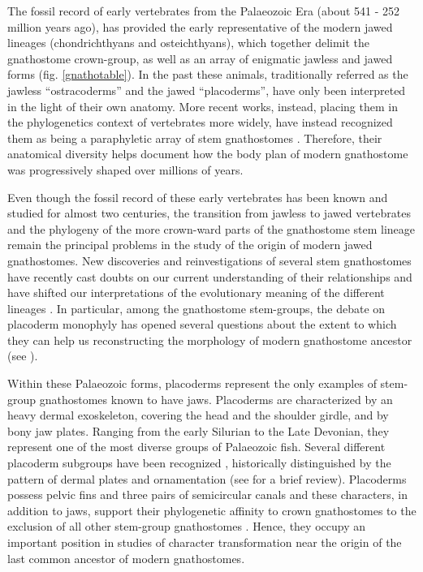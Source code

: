 \documentclass[11pt,letterpaper]{report}
\begin{document}
The fossil record of early vertebrates from the Palaeozoic Era (about 541 - 252 million years ago), has provided the early representative of the modern jawed lineages (chondrichthyans and osteichthyans), which together delimit the gnathostome crown-group, as well as an array of enigmatic jawless and jawed forms (fig. \ref{gnathotable}). In the past these animals, traditionally referred as the jawless “ostracoderms” and the jawed “placoderms”, have only been interpreted in the light of their own anatomy. More recent works, instead, placing them in the phylogenetics context of vertebrates more widely, have instead recognized them as being a paraphyletic array of stem gnathostomes \citep{Forey1984,Forey1993,Donoghue2000,Janvier2008,Janvier2015}. Therefore, their anatomical diversity helps document how the body plan of modern gnathostome was progressively shaped over millions of years.

Even though the fossil record of these early vertebrates has been known and studied for almost two centuries, the transition from jawless to jawed vertebrates and the phylogeny of the more crown-ward parts of the gnathostome stem lineage remain the principal problems in the study of the origin of modern jawed gnathostomes. New discoveries and reinvestigations of several stem gnathostomes have recently cast doubts on our current understanding of their relationships and have shifted our interpretations of the evolutionary meaning of the different lineages \citep{brazeau2009braincase,Gai2011,zhu2013silurian,giles2015osteichthyan}. In particular, among the gnathostome stem-groups, the debate on placoderm monophyly has opened several questions about the extent to which they can help us reconstructing the morphology of modern gnathostome ancestor (see \citealt{brazeau2015origin}).

Within these Palaeozoic forms, placoderms represent the only examples of stem-group gnathostomes known to have jaws. Placoderms are characterized by an heavy dermal exoskeleton, covering the head and the shoulder girdle, and by bony jaw plates. Ranging from the early Silurian to the Late Devonian, they represent one of the most diverse groups of Palaeozoic fish. Several different placoderm subgroups have been recognized \citep{Stensi1969,Denison1978,Janvier1996}, historically distinguished by the pattern of dermal plates and ornamentation (see \citealt{Young2010} for a brief review). Placoderms possess pelvic fins and three pairs of semicircular canals and these characters, in addition to jaws, support their phylogenetic affinity to crown gnathostomes  to the exclusion of all other stem-group gnathostomes \citep{Young1986,Goujet2001,goujet2004placoderm}. Hence, they occupy an important position in studies of character transformation near the origin of the last common ancestor of modern gnathostomes. 
\end{document}
